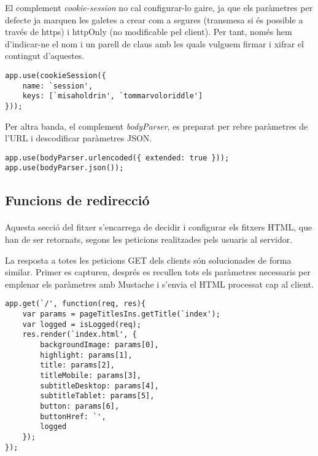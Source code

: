     El complement \emph{cookie-session} no cal configurar-lo gaire, ja que els paràmetres per defecte ja marquen les galetes a crear com a segures (transmesa si és possible a través de https) i httpOnly (no modificable pel client). Per tant, només hem d'indicar-ne el nom i un parell de claus amb les quals vulguem firmar i xifrar el contingut d'aquestes.

    \begin{lstlisting}[style=rawOwn,caption={Configuració del complement \emph{cookie-session}}]
app.use(cookieSession({
    name: `session',
    keys: [`misaholdrin', `tommarvoloriddle']
}));
    \end{lstlisting}

    Per altra banda, el complement \emph{bodyParser}, es preparat per rebre paràmetres de l'URL i descodificar paràmetres JSON.

    \begin{lstlisting}[style=rawOwn,caption={Configuració del complement \emph{bodyParser}}]
app.use(bodyParser.urlencoded({ extended: true }));
app.use(bodyParser.json());
    \end{lstlisting}


    \subsection{Funcions de redirecció}

    \paragraph{}
    Aquesta secció del fitxer s'encarrega de decidir i configurar els fitxers HTML, que han de ser retornats, segons les peticions realitzades pels usuaris al servidor.

    La resposta a totes les peticions GET dels clients són solucionades de forma similar. Primer es capturen, després es recullen tots els paràmetres necessaris per emplenar els paràmetres amb Mustache i s'envia el HTML processat cap al client.

    \begin{lstlisting}[style=rawOwn,caption={Respota del servidor davant la petició del recurs `/'}]
app.get(`/', function(req, res){
    var params = pageTitlesIns.getTitle(`index');
    var logged = isLogged(req);
    res.render(`index.html', {
        backgroundImage: params[0],
        highlight: params[1],
        title: params[2],
        titleMobile: params[3],
        subtitleDesktop: params[4],
        subtitleTablet: params[5],
        button: params[6],
        buttonHref: `',
        logged
    });
});
    \end{lstlisting}

